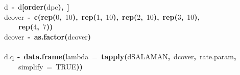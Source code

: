 \documentclass{article}
\makeatletter
\newcommand{\hlnumber}[1]{\textcolor[rgb]{0,0,0}{#1}}%
\newcommand{\hlfunctioncall}[1]{\textcolor[rgb]{.5,0,.33}{\textbf{#1}}}%
\newcommand{\hlkeyword}[1]{\textbf{#1}}%
\newcommand{\hlargument}[1]{\textcolor[rgb]{.69,.25,.02}{#1}}%
\newcommand{\hlassignement}[1]{\textbf{#1}}%
\newcommand{\hlsymbol}[1]{#1}%
\newcommand{\hlstd}[1]{\textcolor[rgb]{0,0,0}{#1}}%
\newenvironment{kframe}{%
 \def\FrameCommand##1{\hskip\@totalleftmargin \hskip-\fboxsep
 \colorbox{shadecolor}{##1}\hskip-\fboxsep
     \hskip-\linewidth \hskip-\@totalleftmargin \hskip\columnwidth}%
 \MakeFramed {\advance\hsize-\width
   \@totalleftmargin\z@ \linewidth\hsize
   \@setminipage}}%
 {\par\unskip\endMakeFramed}
\newenvironment{knitrout}{}{} %
\makeatother
\begin{document}
\begin{knitrout}
{\begin{kframe}
\begin{flushleft}
\hlstd{}\hlkeyword{\usebox{\hlnormalsizeboxclosebrace}}\hspace*{\fill}\\
\hlstd{}\hspace*{\fill}\\
\hlstd{}\hlsymbol{d}{\ }\hlassignement{\usebox{\hlnormalsizeboxlessthan}-}{\ }\hlsymbol{d}\hlkeyword{[}\hlfunctioncall{order}\hlkeyword{(}\hlsymbol{d}\hlkeyword{\usebox{\hlnormalsizeboxdollar}}\hlsymbol{pc}\hlkeyword{)}\hlkeyword{,}{\ }\hlkeyword{]}\hspace*{\fill}\\
\hlstd{}\hlsymbol{d}\hlkeyword{\usebox{\hlnormalsizeboxdollar}}\hlsymbol{cover}{\ }\hlassignement{\usebox{\hlnormalsizeboxlessthan}-}{\ }\hlfunctioncall{c}\hlkeyword{(}\hlfunctioncall{rep}\hlkeyword{(}\hlnumber{0}\hlkeyword{,}{\ }\hlnumber{10}\hlkeyword{)}\hlkeyword{,}{\ }\hlfunctioncall{rep}\hlkeyword{(}\hlnumber{1}\hlkeyword{,}{\ }\hlnumber{10}\hlkeyword{)}\hlkeyword{,}{\ }\hlfunctioncall{rep}\hlkeyword{(}\hlnumber{2}\hlkeyword{,}{\ }\hlnumber{10}\hlkeyword{)}\hlkeyword{,}{\ }\hlfunctioncall{rep}\hlkeyword{(}\hlnumber{3}\hlkeyword{,}{\ }\hlnumber{10}\hlkeyword{)}\hlkeyword{,}\hspace*{\fill}\\
\hlstd{}{\ }{\ }{\ }{\ }\hlfunctioncall{rep}\hlkeyword{(}\hlnumber{4}\hlkeyword{,}{\ }\hlnumber{7}\hlkeyword{)}\hlkeyword{)}\hspace*{\fill}\\
\hlstd{}\hlsymbol{d}\hlkeyword{\usebox{\hlnormalsizeboxdollar}}\hlsymbol{cover}{\ }\hlassignement{\usebox{\hlnormalsizeboxlessthan}-}{\ }\hlfunctioncall{as.factor}\hlkeyword{(}\hlsymbol{d}\hlkeyword{\usebox{\hlnormalsizeboxdollar}}\hlsymbol{cover}\hlkeyword{)}\hspace*{\fill}\\
\hlstd{}\hspace*{\fill}\\
\hlstd{}\hlsymbol{d.q}{\ }\hlassignement{\usebox{\hlnormalsizeboxlessthan}-}{\ }\hlfunctioncall{data.frame}\hlkeyword{(}\hlargument{lambda}{\ }\hlargument{=}{\ }\hlfunctioncall{tapply}\hlkeyword{(}\hlsymbol{d}\hlkeyword{\usebox{\hlnormalsizeboxdollar}}\hlsymbol{SALAMAN}\hlkeyword{,}{\ }\hlsymbol{d}\hlkeyword{\usebox{\hlnormalsizeboxdollar}}\hlsymbol{cover}\hlkeyword{,}{\ }\hlsymbol{rate.param}\hlkeyword{,}\hspace*{\fill}\\
\hlstd{}{\ }{\ }{\ }{\ }\hlargument{simplify}{\ }\hlargument{=}{\ }\hlnumber{TRUE}\hlkeyword{)}\hlkeyword{)}\hspace*{\fill}\\

\end{flushleft}
\end{kframe}}
\end{knitrout}
\end{document}
